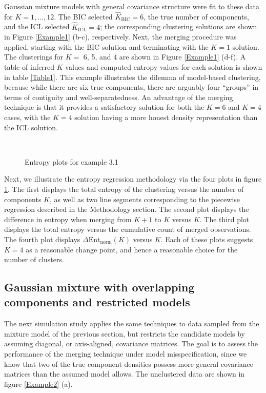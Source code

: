 \documentclass{uwstat572}
\newcommand*\estim[1]{\widehat{#1}}
\renewcommand\;{\,}
\begin{document}
Gaussian mixture models with general covariance structure were fit to these data for $K = 1, \dotsc, 12$.
The BIC selected $\estim K_{\text{BIC}} = 6$, the true number of components, and the ICL selected $\estim K_{\text{ICL}} = 4$; the corresponding clustering solutions are shown in Figure \ref{Example1} (b-c), respectively.
Next, the merging procedure was applied, starting with the BIC solution and terminating with the $K = 1$ solution.
The clusterings for $K = $ 6, 5, and 4 are shown in Figure \ref{Example1} (d-f).
A table of inferred $K$ values and computed entropy values for each solution is shown in table \ref{Table1}.
This example illustrates the dilemma of model-based clustering, because while there are six true components, there are arguably four ``groups'' in terms of contiguity and well-separatedness.
An advantage of the merging technique is that it provides a satisfactory solution for both the $K = 6$ and $K = 4$ cases, with the $K = 4$ solution having a more honest density representation than the ICL solution.
\begin{figure}
\begin{center}
\\
\end{center}
\caption{Entropy plots for example 3.1}
\label{Entropy1}
\end{figure}


Next, we illustrate the entropy regression methodology via the four plots in figure \ref{Entropy1}.
The first displays the total entropy of the clustering versus the number of components $K$, as well as two line segments corresponding to the piecewise regression described in the Methodology section.
The second plot displays the difference in entropy when merging from $K + 1$ to $K$ versus $K$.
The third plot displays the total entropy versus the cumulative count of merged observations.
The fourth plot displays $\Delta \text{Ent}_\text{norm}(K)$ versus $K$.
Each of these plots suggests $K = 4$ as a reasonable change point, and hence a reasonable choice for the number of clusters.

\subsection{Gaussian mixture with overlapping components and restricted models}
The next simulation study applies the same techniques to data sampled from the mixture model of the previous section, but restricts the candidate models by assuming diagonal, or axis-aligned, covariance matrices.
The goal is to assess the performance of the merging technique under model misspecification, since we know that two of the true component densities possess more general covariance matrices than the assumed model allows.
The unclustered data are shown in figure \ref{Example2} (a).
\end{document}
